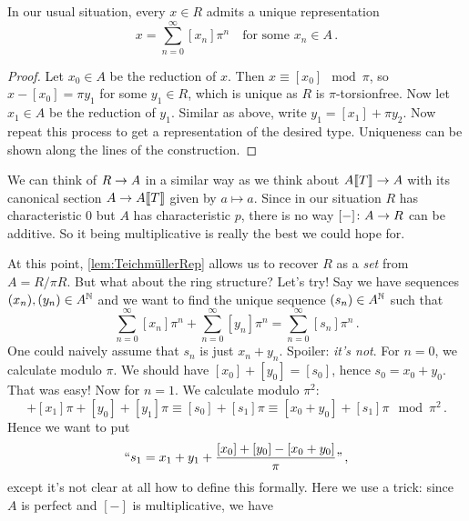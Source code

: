 \documentclass[a4paper, 10pt, oneside, DIV=9, chapterprefix=true, numbers=enddot,bibliography=totoc]{scrbook}
\begin{document}
\begin{lem}\label{lem:TeichmüllerRep}
	In our usual situation, every $x\in R$ admits a unique representation
	\begin{equation*}
		x=\sum_{n=0}^{\infty}[x_n]\pi^n\quad\text{for some }x_n\in A\,.
	\end{equation*}
\end{lem}
\begin{proof}
	Let $x_0\in A$ be the reduction of $x$. Then $x\equiv[x_0]\mod \pi$, so $x-[x_0]=\pi y_1$ for some $y_1\in R$, which is unique as $R$ is $\pi$-torsionfree. Now let $x_1\in A$ be the reduction of $y_1$. Similar as above, write $y_1=[x_1]+\pi y_2$. Now repeat this process to get a representation of the desired type. Uniqueness can be shown along the lines of the construction.
\end{proof}
\begin{urem}
	We can think of $R\morphism A$ in a similar way as we think about $A\llbracket T\rrbracket\morphism A$ with its canonical section $A\morphism A\llbracket T\rrbracket$ given by $a\mapsto a$. Since in our situation $R$ has characteristic $0$ but $A$ has characteristic $p$, there is no way $[-]\colon A\morphism R$ can be additive. So it being multiplicative is really the best we could hope for.
\end{urem}
At this point, \cref{lem:TeichmüllerRep} allows us to recover $R$ as a \emph{set} from $A=R/\pi R$. But what about the ring structure? Let's try! Say we have sequences $(x_n),(y_n)\in A^{\mathbb{N}}$ and we want to find the unique sequence $(s_n)\in A^{\mathbb{N}}$ such that
\begin{equation*}
	\sum_{n=0}^{\infty}[x_n]\pi^n+\sum_{n=0}^{\infty}[y_n]\pi^n=\sum_{n=0}^\infty [s_n]\pi^n\,.
\end{equation*}
One could naively assume that $s_n$ is just $x_n+y_n$. Spoiler: \emph{it's not}. For $n=0$, we calculate modulo $\pi$. We should have $[x_0]+[y_0]=[s_0]$, hence $s_0=x_0+y_0$. That was easy! Now for $n=1$. We calculate modulo $\pi^2$:
\begin{equation*}
	[x_0]+[x_1]\pi+[y_0]+[y_1]\pi\equiv [s_0]+[s_1]\pi\equiv [x_0+y_0]+[s_1]\pi\mod \pi^2\,.
\end{equation*}
Hence we want to put
\begin{equation*}
	``s_1=x_1+y_1+\frac{[x_0]+[y_0]-[x_0+y_0]}{\pi}\text{''}\,,
\end{equation*}
except it's not clear at all how to define this formally. Here we use a trick: since $A$ is perfect and $[-]$ is multiplicative, we have
\end{document}
